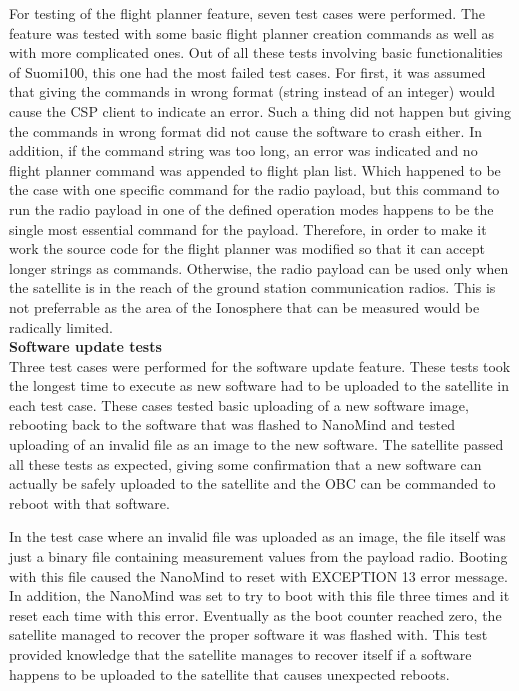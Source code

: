\documentclass[english,12pt,a4paper,pdftex,elec,utf8]{aaltothesis}
\begin{document}
For testing of the flight planner feature, seven test cases were performed. The feature was tested with some basic flight planner creation commands as well as with more complicated ones. Out of all these tests involving basic functionalities of Suomi100, this one had the most failed test cases. For first, it was assumed that giving the commands in wrong format (string instead of an integer) would cause the CSP client to indicate an error. Such a thing did not happen but giving the commands in wrong format did not cause the software to crash either. In addition, if the command string was too long, an error was indicated and no flight planner command was appended to flight plan list. Which happened to be the case with one specific command for the radio payload, but this command to run the radio payload in one of the defined operation modes happens to be the single most essential command for the payload. Therefore, in order to make it work the source code for the flight planner was modified so that it can accept longer strings as commands. Otherwise, the radio payload can be used only when the satellite is in the reach of the ground station communication radios. This is not preferrable as the area of the Ionosphere that can be measured would be radically limited.\\
\textbf{Software update tests}
\\ 
Three test cases were performed for the software update feature. These tests took the longest time to execute as new software had to be uploaded to the satellite in each test case. These cases tested basic uploading of a new software image, rebooting back to the software that was flashed to NanoMind and tested uploading of an invalid file as an image to the new software. The satellite passed all these tests as expected, giving some confirmation that a new software can actually be safely uploaded to the satellite and the OBC can be commanded to reboot with that software. \par
In the test case where an invalid file was uploaded as an image, the file itself was just a binary file containing measurement values from the payload radio. Booting with this file caused the NanoMind to reset with EXCEPTION 13 error message. In addition, the NanoMind was set to try to boot with this file three times and it reset each time with this error. Eventually as the boot counter reached zero, the satellite managed to recover the proper software it was flashed with. This test provided knowledge that the satellite manages to recover itself if a software happens to be uploaded to the satellite that causes unexpected reboots.\par
\end{document}

